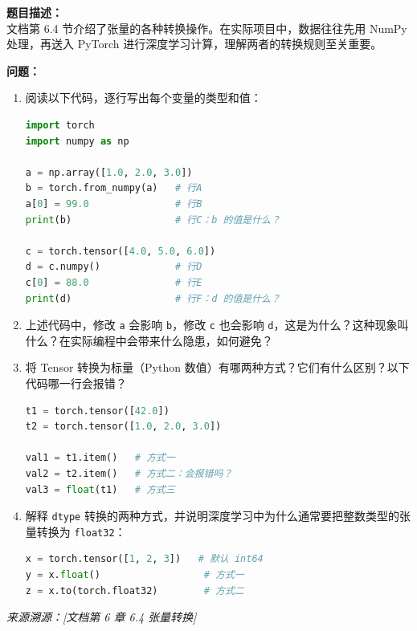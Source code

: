 \documentclass[a4paper,11pt]{ctexart}
\begin{document}
\begin{problembox}
    \textbf{题目描述：}\\
    文档第 6.4 节介绍了张量的各种转换操作。在实际项目中，数据往往先用 NumPy 处理，再送入 PyTorch 进行深度学习计算，理解两者的转换规则至关重要。

    \vspace{0.3cm}
    \textbf{问题：}
    \begin{enumerate}[(1)]
        \item 阅读以下代码，逐行写出每个变量的类型和值：
        \begin{lstlisting}[language=Python]
import torch
import numpy as np

a = np.array([1.0, 2.0, 3.0])
b = torch.from_numpy(a)   # 行A
a[0] = 99.0               # 行B
print(b)                  # 行C：b 的值是什么？

c = torch.tensor([4.0, 5.0, 6.0])
d = c.numpy()             # 行D
c[0] = 88.0               # 行E
print(d)                  # 行F：d 的值是什么？
        \end{lstlisting}

        \item 上述代码中，修改 \texttt{a} 会影响 \texttt{b}，修改 \texttt{c} 也会影响 \texttt{d}，这是为什么？这种现象叫什么？在实际编程中会带来什么隐患，如何避免？

        \item 将 Tensor 转换为标量（Python 数值）有哪两种方式？它们有什么区别？以下代码哪一行会报错？
        \begin{lstlisting}[language=Python]
t1 = torch.tensor([42.0])
t2 = torch.tensor([1.0, 2.0, 3.0])

val1 = t1.item()   # 方式一
val2 = t2.item()   # 方式二：会报错吗？
val3 = float(t1)   # 方式三
        \end{lstlisting}

        \item 解释 \texttt{dtype} 转换的两种方式，并说明深度学习中为什么通常要把整数类型的张量转换为 \texttt{float32}：
        \begin{lstlisting}[language=Python]
x = torch.tensor([1, 2, 3])   # 默认 int64
y = x.float()                  # 方式一
z = x.to(torch.float32)        # 方式二
        \end{lstlisting}
    \end{enumerate}

    \vspace{0.2cm}
    {\color{gray}\small\textit{来源溯源：[文档第 6 章 6.4 张量转换]}}
\end{problembox}
\end{document}
